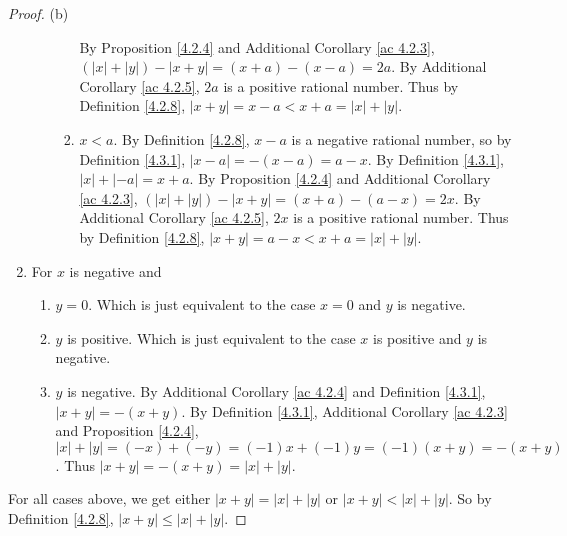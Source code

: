 \begin{proof}{(b)}
\begin{enumerate}[label=(\Roman*)]
\begin{enumerate}[label=(\roman*)]
\begin{enumerate}[label=(\arabic*)]
            By Proposition \ref{4.2.4} and Additional Corollary \ref{ac 4.2.3}, \((|x| + |y|) - |x + y| = (x + a) - (x - a) = 2a\).
            By Additional Corollary \ref{ac 4.2.5}, \(2a\) is a positive rational number.
            Thus by Definition \ref{4.2.8}, \(|x + y| = x - a < x + a = |x| + |y|\).
            \item \(x < a\).
            By Definition \ref{4.2.8}, \(x - a\) is a negative rational number, so by Definition \ref{4.3.1}, \(|x - a| = -(x - a) = a - x\).
            By Definition \ref{4.3.1}, \(|x| + |-a| = x + a\).
            By Proposition \ref{4.2.4} and Additional Corollary \ref{ac 4.2.3}, \((|x| + |y|) - |x + y| = (x + a) - (a - x) = 2x\).
            By Additional Corollary \ref{ac 4.2.5}, \(2x\) is a positive rational number.
            Thus by Definition \ref{4.2.8}, \(|x + y| = a - x < x + a = |x| + |y|\).
        \end{enumerate}
    \end{enumerate}
    \item For \(x\) is negative and
    \begin{enumerate}[label=(\roman*)]
        \item \(y = 0\).
        Which is just equivalent to the case \(x = 0\) and \(y\) is negative.
        \item \(y\) is positive.
        Which is just equivalent to the case \(x\) is positive and \(y\) is negative.
        \item \(y\) is negative.
        By Additional Corollary \ref{ac 4.2.4} and Definition \ref{4.3.1}, \(|x + y| = -(x + y)\).
        By Definition \ref{4.3.1}, Additional Corollary \ref{ac 4.2.3} and Proposition \ref{4.2.4}, \(|x| + |y| = (-x) + (-y) = (-1)x + (-1)y = (-1)(x + y) = -(x + y)\).
        Thus \(|x + y| = -(x + y) = |x| + |y|\).
    \end{enumerate}
\end{enumerate}
For all cases above, we get either \(|x + y| = |x| + |y|\) or \(|x + y| < |x| + |y|\).
So by Definition \ref{4.2.8}, \(|x + y| \leq |x| + |y|\).
\end{proof}

